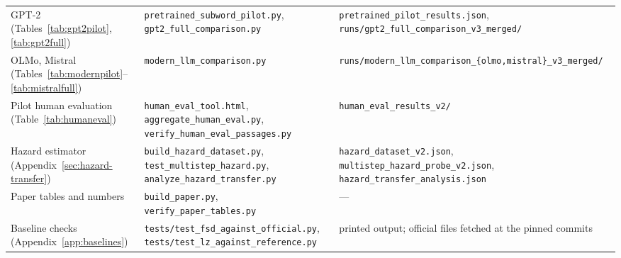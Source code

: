 \documentclass[make,article,submit,pdftex]{Definitions/mdpi}
\begin{document}
\begin{table}[H]
\begin{tabular}{@{}p{}p{}p{}@{}}
GPT-2 (Tables~\ref{tab:gpt2pilot}, \ref{tab:gpt2full}) & \texttt{pretrained\_\allowbreak{}subword\_\allowbreak{}pilot.py}, \texttt{gpt2\_\allowbreak{}full\_\allowbreak{}comparison.py} & \texttt{pretrained\_\allowbreak{}pilot\_\allowbreak{}results.json}, \texttt{runs/gpt2\_\allowbreak{}full\_\allowbreak{}comparison\_\allowbreak{}v3\_\allowbreak{}merged/} \\
OLMo, Mistral (Tables~\ref{tab:modernpilot}--\ref{tab:mistralfull}) & \texttt{modern\_\allowbreak{}llm\_\allowbreak{}comparison.py} & \texttt{runs/modern\_\allowbreak{}llm\_\allowbreak{}comparison\_\allowbreak{}\{olmo,mistral\}\_\allowbreak{}v3\_\allowbreak{}merged/} \\
Pilot human evaluation (Table~\ref{tab:humaneval}) & \texttt{human\_\allowbreak{}eval\_\allowbreak{}tool.html}, \texttt{aggregate\_\allowbreak{}human\_\allowbreak{}eval.py}, \texttt{verify\_\allowbreak{}human\_\allowbreak{}eval\_\allowbreak{}passages.py} & \texttt{human\_\allowbreak{}eval\_\allowbreak{}results\_\allowbreak{}v2/} \\
Hazard estimator (Appendix~\ref{sec:hazard-transfer}) & \texttt{build\_\allowbreak{}hazard\_\allowbreak{}dataset.py}, \texttt{test\_\allowbreak{}multistep\_\allowbreak{}hazard.py}, \texttt{analyze\_\allowbreak{}hazard\_\allowbreak{}transfer.py} & \texttt{hazard\_\allowbreak{}dataset\_\allowbreak{}v2.json}, \texttt{multistep\_\allowbreak{}hazard\_\allowbreak{}probe\_\allowbreak{}v2.json}, \texttt{hazard\_\allowbreak{}transfer\_\allowbreak{}analysis.json} \\
Paper tables and numbers & \texttt{build\_\allowbreak{}paper.py}, \texttt{verify\_\allowbreak{}paper\_\allowbreak{}tables.py} & --- \\
Baseline checks (Appendix~\ref{app:baselines}) & \texttt{tests/test\_\allowbreak{}fsd\_\allowbreak{}against\_\allowbreak{}official.py}, \texttt{tests/test\_\allowbreak{}lz\_\allowbreak{}against\_\allowbreak{}reference.py} & printed output; official files fetched at the pinned commits \\
\bottomrule
\end{tabular}
\end{table}
\end{document}
